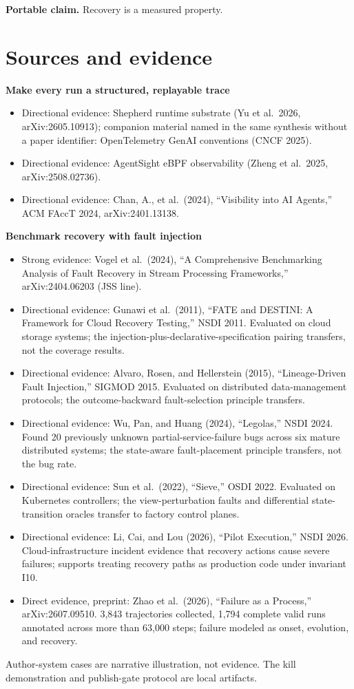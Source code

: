 \textbf{Portable claim.} Recovery is a measured property.

\section*{Sources and evidence}

\textbf{Make every run a structured, replayable trace}

\begin{itemize}
\tightlist
\item
  Directional evidence: Shepherd runtime substrate (Yu et al.~2026, arXiv:2605.10913); companion material named in the same synthesis without a paper identifier: OpenTelemetry GenAI conventions (CNCF 2025).
\item
  Directional evidence: AgentSight eBPF observability (Zheng et al.~2025, arXiv:2508.02736).
\item
  Directional evidence: Chan, A., et al.~(2024), ``Visibility into AI Agents,'' ACM FAccT 2024, arXiv:2401.13138.
\end{itemize}

\textbf{Benchmark recovery with fault injection}

\begin{itemize}
\tightlist
\item
  Strong evidence: Vogel et al.~(2024), ``A Comprehensive Benchmarking Analysis of Fault Recovery in Stream Processing Frameworks,'' arXiv:2404.06203 (JSS line).
\item
  Directional evidence: Gunawi et al.~(2011), ``FATE and DESTINI: A Framework for Cloud Recovery Testing,'' NSDI 2011. Evaluated on cloud storage systems; the injection-plus-declarative-specification pairing transfers, not the coverage results.
\item
  Directional evidence: Alvaro, Rosen, and Hellerstein (2015), ``Lineage-Driven Fault Injection,'' SIGMOD 2015. Evaluated on distributed data-management protocols; the outcome-backward fault-selection principle transfers.
\item
  Directional evidence: Wu, Pan, and Huang (2024), ``Legolas,'' NSDI 2024. Found 20 previously unknown partial-service-failure bugs across six mature distributed systems; the state-aware fault-placement principle transfers, not the bug rate.
\item
  Directional evidence: Sun et al.~(2022), ``Sieve,'' OSDI 2022. Evaluated on Kubernetes controllers; the view-perturbation faults and differential state-transition oracles transfer to factory control planes.
\item
  Directional evidence: Li, Cai, and Lou (2026), ``Pilot Execution,'' NSDI 2026. Cloud-infrastructure incident evidence that recovery actions cause severe failures; supports treating recovery paths as production code under invariant I10.
\item
  Direct evidence, preprint: Zhao et al.~(2026), ``Failure as a Process,'' arXiv:2607.09510. 3,843 trajectories collected, 1,794 complete valid runs annotated across more than 63,000 steps; failure modeled as onset, evolution, and recovery.
\end{itemize}

Author-system cases are narrative illustration, not evidence. The kill demonstration and publish-gate protocol are local artifacts.
